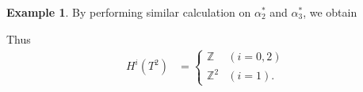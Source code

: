 \documentclass[psamsfonts]{amsart}
\theoremstyle{definition}
\newtheorem{exmp}[thm]{Example}
\theoremstyle{rem}
\numberwithin{equation}{section}
\begin{document}
\begin{exmp}
  By performing similar calculation on $\alpha_2^{\ast}$ and $\alpha_3^{\ast}$, we obtain
  \begin{center}
  \end{center}
  Thus
  \begin{align*}
    H^i(T^2) &= \begin{cases}
      \mathbb{Z}   & (i = 0, 2) \\
      \mathbb{Z}^2 & (i = 1).
    \end{cases}
  \end{align*}


\end{exmp}
\end{document}
